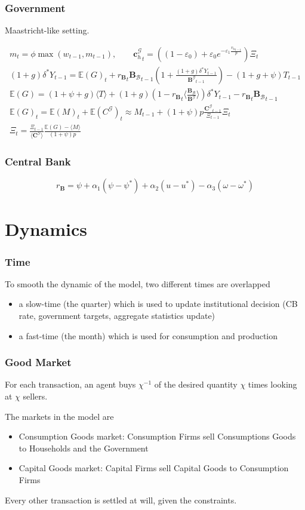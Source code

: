 \documentclass[]{beamer}
\begin{document}
\begin{frame}
	\frametitle{Government}
	Maastricht-like setting.

	\begin{gather*}
		m_{t} = \phi \max(w_{t-1}, m_{t-1}), \qquad {\mathbf{c}^\mathcal{G}_h}_t = ((1 - \varepsilon_0) + \varepsilon_0 e^{-\varepsilon_1\frac{{v_h}_{t-1}}{p}})\Xi_t\\
		(1+g) \delta^* Y_{t-1}  =  {\mathbb{E}(G)}_t + {r_\mathbf{B}}_t {\mathbf{B}_\mathcal{B}}_{t-1} (1 + \frac{(1+g) \delta^* Y_{t-1}}{{\mathbf{B}^\mathcal{G}}_{t-1}}) - (1+g+\psi) T_{t-1} \\
		\mathbb{E}(G)  = (1+\psi+g) \langle T \rangle + (1+g)(1-{r_\mathbf{B}}_t \langle \frac{{\mathbf{B}_\mathcal{B}}}{{\mathbf{B}^\mathcal{G}}} \rangle)\delta^* Y_{t-1} - {r_\mathbf{B}}_t {\mathbf{B}_\mathcal{B}}_{t-1} \\
		\mathbb{E}(G)_t = \mathbb{E}(M)_t + \mathbb{E}(C^\mathcal{G})_t \approx M_{t-1} + (1+\psi) p \frac{{\mathbf{C}^\mathcal{G}}_{t-1}}{\Xi_{t-1}} \Xi_t \\
		\Xi_t          = \frac{\Xi_{t-1}}{\langle {\mathbf{C}^\mathcal{G}} \rangle} \frac{\mathbb{E}(G) - \langle M \rangle}{(1+\psi)p}
	\end{gather*}
\end{frame}

\begin{frame}
	\frametitle{Central Bank}
	$${r_\mathbf{B}} = \psi + \alpha_1 (\psi - \psi^*) + \alpha_2 (u - u^*) - \alpha_3 (\omega - \omega^*)$$
\end{frame}

\section{Dynamics}
\begin{frame}
	\frametitle{Time}
	To smooth the dynamic of the model, two different times are overlapped
	\begin{itemize}
		\item a slow-time (the quarter) which is used to update institutional decision (CB rate, government targets, aggregate statistics update)
		\item a fast-time (the month) which is used for consumption and production
	\end{itemize}
\end{frame}

\begin{frame}
	\frametitle{Good Market}
	For each transaction, an agent buys $\chi^{-1}$ of the desired quantity $\chi$ times looking at $\chi$ sellers.

	The markets in the model are
	\begin{itemize}
		\item Consumption Goods market: Consumption Firms sell Consumptions Goods to Households and the Government
		\item Capital Goods market: Capital Firms sell Capital Goods to Consumption Firms
	\end{itemize}

	Every other transaction is settled at will, given the constraints.
\end{frame}
\end{document}
